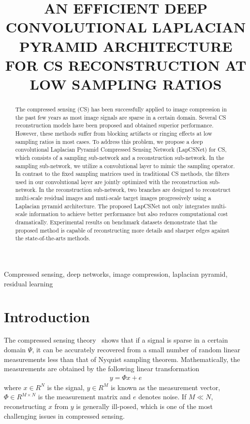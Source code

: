 \documentclass{article}
\title{AN EFFICIENT DEEP CONVOLUTIONAL LAPLACIAN PYRAMID ARCHITECTURE FOR CS RECONSTRUCTION AT LOW SAMPLING RATIOS}
\begin{document}
\maketitle
\begin{abstract}
The compressed sensing (CS) has been successfully applied to image compression in the past few years as most image signals are sparse in a certain domain. Several CS reconstruction models have been proposed and obtained superior performance. However, these methods suffer from blocking artifacts or ringing effects at low sampling ratios in most cases. To address this problem, we propose a deep convolutional Laplacian Pyramid Compressed Sensing Network (LapCSNet) for CS, which consists of a sampling sub-network and a reconstruction sub-network. In the sampling sub-network, we utilize a convolutional layer to mimic the sampling operator. In contrast to the fixed sampling matrices used in traditional CS methods, the filters used in our convolutional layer are jointly optimized with the reconstruction sub-network. In the reconstruction sub-network, two branches are designed to reconstruct multi-scale residual images and muti-scale target images progressively using a Laplacian pyramid architecture. The proposed LapCSNet not only integrates multi-scale information to achieve better performance but also reduces computational cost dramatically. Experimental results on benchmark datasets demonstrate that the proposed method is capable of reconstructing more details and sharper edges against the state-of-the-arts methods.
\end{abstract}
\begin{keywords}
Compressed sensing, deep networks, image compression, laplacian pyramid, residual learning
\end{keywords}
\section{Introduction}
\label{sec:intro}

The compressed sensing theory~\cite{candes2006robust, donoho2006compressed} shows that if a signal is sparse in a certain domain $\Psi$, it can be accurately recovered from a small number of random linear measurements less than that of Nyquist sampling theorem. Mathematically, the measurements are obtained by the following linear transformation
\begin{eqnarray}
\label{equ1}
y = \Phi x + e
\end{eqnarray}
where $x\in R^{N}$ is the signal, $y\in R^{M}$ is known as the measurement vector, $\Phi \in R^{M\times N}$ is the measurement matrix and $e$ denotes noise. If $M\ll N$, reconstructing $x$ from $y$ is generally ill-posed, which is one of the most challenging issues in compressed sensing.
\end{document}
